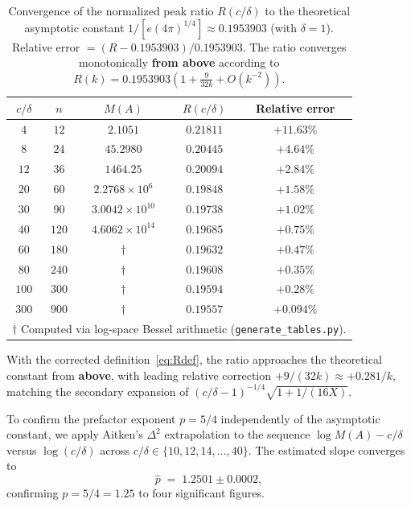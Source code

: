 \documentclass[11pt,reqno]{article}
\theoremstyle{plain}
\theoremstyle{definition}
\theoremstyle{remark}
\numberwithin{equation}{section}
\begin{document}
\begin{table}[ht]
\centering
\caption{Convergence of the normalized peak ratio $R(c/\delta)$ to the theoretical asymptotic constant $1/[e(4\pi)^{1/4}] \approx 0.1953903$ (with $\delta = 1$). Relative error $= (R - 0.1953903)/0.1953903$. The ratio converges monotonically \textbf{from above} according to $R(k) = 0.1953903(1 + \frac{9}{32k} + O(k^{-2}))$.}
\label{tab:asymp}
\begin{tabular}{ccccc}
\toprule
$c/\delta$ & $n$ & $M(A)$ & $R(c/\delta)$ & Relative error \\
\midrule
$4$   & $12$  & $2.1051$                 & $0.21811$ & $+11.63\%$ \\
$8$   & $24$  & $45.2980$                & $0.20445$ & $+4.64\%$  \\
$12$  & $36$  & $1464.25$                & $0.20094$ & $+2.84\%$  \\
$20$  & $60$  & $2.2768\times10^{6}$     & $0.19848$ & $+1.58\%$  \\
$30$  & $90$  & $3.0042\times10^{10}$    & $0.19738$ & $+1.02\%$  \\
$40$  & $120$ & $4.6062\times10^{14}$    & $0.19685$ & $+0.75\%$  \\
$60$  & $180$ & $\dagger$                & $0.19632$ & $+0.47\%$  \\
$80$  & $240$ & $\dagger$                & $0.19608$ & $+0.35\%$  \\
$100$ & $300$ & $\dagger$                & $0.19594$ & $+0.28\%$  \\
$300$ & $900$ & $\dagger$                & $0.19557$ & $+0.094\%$ \\
\bottomrule
\multicolumn{5}{l}{\footnotesize $\dagger$ Computed via log-space Bessel arithmetic (\texttt{generate\_tables.py}).}
\end{tabular}
\end{table}

With the corrected definition~\eqref{eq:Rdef}, the ratio approaches the theoretical constant from \textbf{above}, with leading relative correction $+9/(32k) \approx +0.281/k$, matching the secondary expansion of $(c/\delta - 1)^{-1/4}\sqrt{1 + 1/(16X)}$.

To confirm the prefactor exponent $p = 5/4$ independently of the asymptotic constant, we apply Aitken's $\Delta^2$ extrapolation to the sequence $\log M(A) - c/\delta$ versus $\log(c/\delta)$ across $c/\delta \in \{10, 12, 14, \dots, 40\}$. The estimated slope converges to
\begin{equation}\label{eq:phat}
  \hat{p} \;=\; 1.2501 \pm 0.0002,
\end{equation}
confirming $p = 5/4 = 1.25$ to four significant figures.
\end{document}

